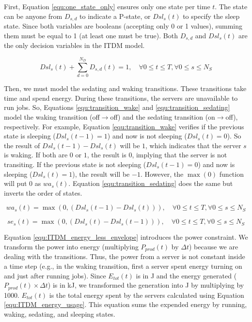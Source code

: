 



First, Equation \ref{equ:one_state_only} ensures only one state per time $t$. The state can be anyone from $D_{s,d}$ to indicate a P-state, or $Dsl_{s}(t)$ to specify the sleep state. Since both variables are booleans (accepting only 0 or 1 values), summing them must be equal to 1 (at least one must be true). Both $D_{s,d}$ and $Dsl_{s}(t)$ are the only decision variables in the ITDM model.

\begin{equation}
    \label{equ:one_state_only}
    Dsl_{s}(t) + \sum_{d=0}^{N_{D}} D_{s,d}(t) = 1, \quad \forall 0 \le t \le T, \forall 0 \le s \le N_{S}
\end{equation}

Then, we must model the sedating and waking transitions. These transitions take time and spend energy. During these transitions, the servers are unavailable to run jobs. So, Equations \ref{equ:transition_wake} and \ref{equ:transition_sedating} model the waking transition (off$\rightarrow$off) and the sedating transition (on$\rightarrow$off), respectively. For example, Equation \ref{equ:transition_wake} verifies if the previous state is sleeping ($Dsl_{s}(t-1) = 1$) and now is not sleeping ($Dsl_{s}(t) = 0$). So the result of $Dsl_{s}(t-1) - Dsl_{s}(t)$ will be $1$, which indicates that the server $s$ is waking. If both are $0$ or $1$, the result is $0$, implying that the server is not transiting. If the previous state is not sleeping ($Dsl_{s}(t-1) = 0$) and now is sleeping ($Dsl_{s}(t) = 1$), the result will be $-1$. However, the $\max (0)$ function will put 0 as $wa_s(t)$. Equation \ref{equ:transition_sedating} does the same but inverts the order of states.

\begin{equation}
    \label{equ:transition_wake}
    wa_{s}(t) = \max(0, (Dsl_{s}(t-1) - Dsl_{s}(t))), \quad \forall 0 \le t \le T, \forall 0 \le s \le N_{S}
\end{equation}

\begin{equation}
    \label{equ:transition_sedating}
    se_{s}(t) = \max(0, (Dsl_{s}(t) - Dsl_{s}(t-1))), \quad \forall 0 \le t \le T, \forall 0 \le s \le N_{S}
\end{equation}

Equation \ref{equ:ITDM_energy_less_envelope} introduces the power constraint. We transform the power into energy (multiplying $P_{prod}(t)$ by $\Delta t$) because we are dealing with the transitions. Thus, the power from a server is not constant inside a time step (e.g., in the waking transition, first a server spent energy turning on and just after running jobs). Since $E_{tot}(t)$ is in J and the energy generated ($P_{prod}(t) \times \Delta t$) is in kJ, we transformed the generation into J by multiplying by 1000. $E_{tot}(t)$ is the total energy spent by the servers calculated using Equation \ref{equ:ITDM_energy_usage}. This equation sums the expended energy by running, waking, sedating, and sleeping states.


